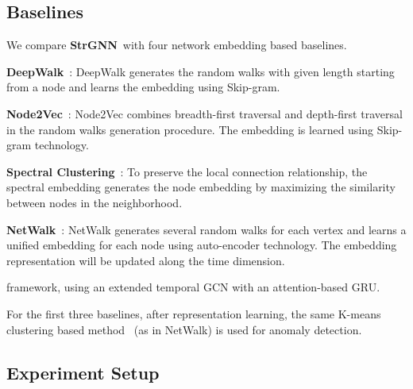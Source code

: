\documentclass{article}
\newcommand{\model}{\textbf{StrGNN}~}
\begin{document}
\subsection{Baselines}
We compare \model with four network embedding based baselines. 

\textbf{DeepWalk}~\cite{perozzi2014deepwalk}: DeepWalk generates the random walks with given length starting from a node and learns the embedding using Skip-gram. 

\textbf{Node2Vec}~\cite{grover2016node2vec}: Node2Vec combines breadth-first traversal and depth-first traversal in the random walks generation procedure. The embedding is learned using Skip-gram technology. 

\textbf{Spectral Clustering}~\cite{spectralclustering2007}: To preserve the local connection relationship, the spectral embedding generates the node embedding by maximizing the similarity between nodes in the neighborhood.

\textbf{NetWalk}~\cite{yu2018netwalk}: NetWalk generates several random walks for each vertex and learns a unified embedding for each node using auto-encoder technology. The embedding representation will be updated along the time dimension.

framework, using an extended temporal GCN with an attention-based GRU.


For the first three baselines, after representation learning, the same K-means clustering based method~\cite{yu2018netwalk} (as in NetWalk) is used for anomaly detection. 

\subsection{Experiment Setup}
\end{document}
